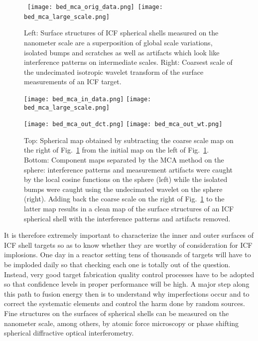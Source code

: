 \begin{figure}
\centerline{
\hbox{
\texttt{[image: bed\_mca\_orig\_data.png]}
\texttt{[image: bed\_mca\_large\_scale.png]}
}
}
\caption{Left: Surface structures of ICF spherical shells measured on the nanometer scale are a superposition of global scale variations, isolated bumps and scratches as well as artifacts which look like interference patterns on intermediate scales. Right: Coarsest scale of the undecimated isotropic wavelet transform of the surface measurements of an ICF target.}
\label{bedros_mca_data}
\end{figure}
\begin{figure}[htb]
\centerline{
\texttt{[image: bed\_mca\_in\_data.png]}
\texttt{[image: bed\_mca\_large\_scale.png]}
}
\centerline{
\texttt{[image: bed\_mca\_out\_dct.png]}
\texttt{[image: bed\_mca\_out\_wt.png]}
}
\caption{Top: Spherical map obtained by subtracting the coarse scale map on the right of Fig.~\ref{bedros_mca_data} from the initial map on the left of Fig.~\ref{bedros_mca_data}. Bottom: Component maps separated by the MCA method on the sphere: interference patterns and measurement artifacts were caught by the local cosine functions on the sphere (left) while  the isolated bumps were caught using the undecimated wavelet on the sphere (right). Adding back the coarse scale on the right of Fig.~\ref{bedros_mca_data} to the latter map results in a clean map of the surface structures of an ICF spherical shell with the interference patterns and artifacts removed.} 
\label{bedros_mca_result}
\end{figure}

It is therefore extremely important to characterize the inner and outer surfaces of ICF shell targets so as to know whether they are worthy of consideration for ICF implosions. One day in a reactor setting tens of thousands of targets will have to be imploded daily so that checking each one is totally out of the question. Instead, very good target fabrication quality control processes have to be adopted so that confidence levels in proper performance will be high. A major step along this path to fusion energy then is to understand why imperfections occur and to correct the systematic elements and control the harm done by random sources.
%
Fine structures on the surfaces of spherical shells can be measured on the nanometer scale, among others,  by atomic force microscopy or phase shifting spherical diffractive optical interferometry. 

